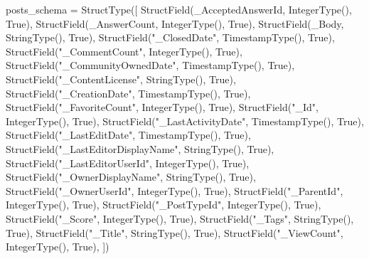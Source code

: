 \documentclass[
  letterpaper,
  DIV=11,
  numbers=noendperiod]{scrreprt}
\newenvironment{Shaded}{\begin{snugshade}}{\end{snugshade}}
\newcommand{\NormalTok}[1]{\textcolor[rgb]{0.00,0.23,0.31}{#1}}
\newcommand{\OperatorTok}[1]{\textcolor[rgb]{0.37,0.37,0.37}{#1}}
\newcommand{\StringTok}[1]{\textcolor[rgb]{0.13,0.47,0.30}{#1}}
\newcommand{\VariableTok}[1]{\textcolor[rgb]{0.07,0.07,0.07}{#1}}
\begin{document}
\begin{Shaded}
\begin{Highlighting}[]
\NormalTok{posts\_schema }\OperatorTok{=}\NormalTok{ StructType([}
\NormalTok{    StructField(}\StringTok{\textquotesingle{}\_AcceptedAnswerId\textquotesingle{}}\NormalTok{, IntegerType(), }\VariableTok{True}\NormalTok{),}
\NormalTok{    StructField(}\StringTok{\textquotesingle{}\_AnswerCount\textquotesingle{}}\NormalTok{, IntegerType(), }\VariableTok{True}\NormalTok{),}
\NormalTok{    StructField(}\StringTok{\textquotesingle{}\_Body\textquotesingle{}}\NormalTok{, StringType(), }\VariableTok{True}\NormalTok{),}
\NormalTok{    StructField(}\StringTok{"\_ClosedDate"}\NormalTok{, TimestampType(), }\VariableTok{True}\NormalTok{),}
\NormalTok{    StructField(}\StringTok{"\_CommentCount"}\NormalTok{, IntegerType(), }\VariableTok{True}\NormalTok{),}
\NormalTok{    StructField(}\StringTok{"\_CommunityOwnedDate"}\NormalTok{, TimestampType(), }\VariableTok{True}\NormalTok{),}
\NormalTok{    StructField(}\StringTok{"\_ContentLicense"}\NormalTok{, StringType(), }\VariableTok{True}\NormalTok{),}
\NormalTok{    StructField(}\StringTok{"\_CreationDate"}\NormalTok{, TimestampType(), }\VariableTok{True}\NormalTok{),}
\NormalTok{    StructField(}\StringTok{"\_FavoriteCount"}\NormalTok{, IntegerType(), }\VariableTok{True}\NormalTok{),}
\NormalTok{    StructField(}\StringTok{"\_Id"}\NormalTok{, IntegerType(), }\VariableTok{True}\NormalTok{),}
\NormalTok{    StructField(}\StringTok{"\_LastActivityDate"}\NormalTok{, TimestampType(), }\VariableTok{True}\NormalTok{),}
\NormalTok{    StructField(}\StringTok{"\_LastEditDate"}\NormalTok{, TimestampType(), }\VariableTok{True}\NormalTok{),}
\NormalTok{    StructField(}\StringTok{"\_LastEditorDisplayName"}\NormalTok{, StringType(), }\VariableTok{True}\NormalTok{),}
\NormalTok{    StructField(}\StringTok{"\_LastEditorUserId"}\NormalTok{, IntegerType(), }\VariableTok{True}\NormalTok{),}
\NormalTok{    StructField(}\StringTok{"\_OwnerDisplayName"}\NormalTok{, StringType(), }\VariableTok{True}\NormalTok{),}
\NormalTok{    StructField(}\StringTok{"\_OwnerUserId"}\NormalTok{, IntegerType(), }\VariableTok{True}\NormalTok{),}
\NormalTok{    StructField(}\StringTok{"\_ParentId"}\NormalTok{, IntegerType(), }\VariableTok{True}\NormalTok{),}
\NormalTok{    StructField(}\StringTok{"\_PostTypeId"}\NormalTok{, IntegerType(), }\VariableTok{True}\NormalTok{),}
\NormalTok{    StructField(}\StringTok{"\_Score"}\NormalTok{, IntegerType(), }\VariableTok{True}\NormalTok{),}
\NormalTok{    StructField(}\StringTok{"\_Tags"}\NormalTok{, StringType(), }\VariableTok{True}\NormalTok{),}
\NormalTok{    StructField(}\StringTok{"\_Title"}\NormalTok{, StringType(), }\VariableTok{True}\NormalTok{),}
\NormalTok{    StructField(}\StringTok{"\_ViewCount"}\NormalTok{, IntegerType(), }\VariableTok{True}\NormalTok{),}
\NormalTok{])}
\end{Highlighting}
\end{Shaded}
\end{document}

